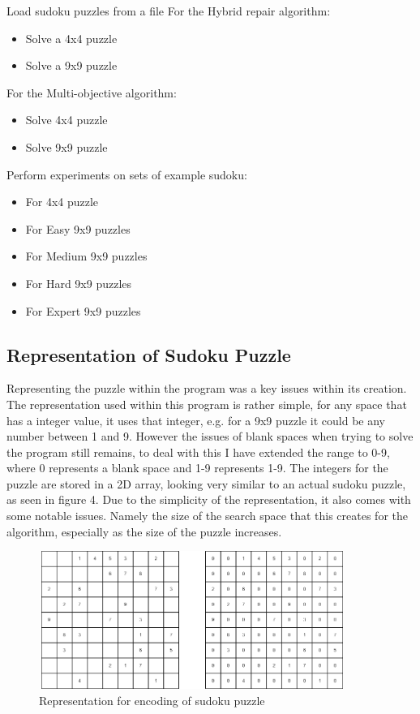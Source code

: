 \documentclass[a4paper,11pt]{article}
\begin{document}
Load sudoku puzzles from a file\newline
For the Hybrid repair algorithm:
\begin{itemize}
	\item Solve a 4x4 puzzle  
	\item Solve a 9x9 puzzle
\end{itemize}
For the Multi-objective algorithm:
\begin{itemize}
	\item Solve 4x4 puzzle
	\item Solve 9x9 puzzle
\end{itemize}
Perform experiments on sets of example sudoku:
\begin{itemize}
	\item For 4x4 puzzle
	\item For Easy 9x9 puzzles
	\item For Medium 9x9 puzzles
	\item For Hard 9x9 puzzles
	\item For Expert 9x9 puzzles
\end{itemize}



\subsection{Representation of Sudoku Puzzle}
Representing the puzzle within the program was a key issues within its creation. The representation used within this program is rather simple, for any space that has a integer value, it uses that integer, e.g. for a 9x9 puzzle it could be any number between 1 and 9. However the issues of blank spaces when trying to solve the program still remains, to deal with this I have extended the range to 0-9, where 0 represents a blank space and 1-9 represents 1-9. The integers for the puzzle are stored in a 2D array, looking very similar to an actual sudoku puzzle, as seen in figure 4. Due to the simplicity of the representation, it also comes with some notable issues. Namely the size of the search space that this creates for the algorithm, especially as the size of the puzzle increases. 
\begin{figure}[H]
	\centering
	\includegraphics[height=4.5cm, width=10cm]{./Diagrams/representationDiagram}
	\caption{Representation for encoding of sudoku puzzle}
\end{figure}
\end{document}
